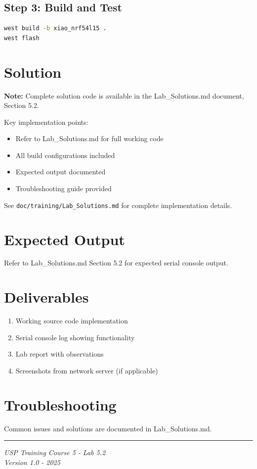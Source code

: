 \documentclass[11pt,a4paper]{article}
\begin{document}
\subsection{Step 3: Build and Test}
\begin{lstlisting}[language=bash]
west build -b xiao_nrf54l15 .
west flash
\end{lstlisting}

\section{Solution}

\begin{solutionbox}
\textbf{Note:} Complete solution code is available in the Lab\_Solutions.md document, Section 5.2.

Key implementation points:
\begin{itemize}
    \item Refer to Lab\_Solutions.md for full working code
    \item All build configurations included
    \item Expected output documented
    \item Troubleshooting guide provided
\end{itemize}

See \texttt{doc/training/Lab\_Solutions.md} for complete implementation details.
\end{solutionbox}

\section{Expected Output}

Refer to Lab\_Solutions.md Section 5.2 for expected serial console output.

\section{Deliverables}

\begin{enumerate}[itemsep=10pt]
    \item Working source code implementation
    \item Serial console log showing functionality
    \item Lab report with observations
    \item Screenshots from network server (if applicable)
\end{enumerate}

\section{Troubleshooting}

Common issues and solutions are documented in Lab\_Solutions.md.

\vfill
\noindent\rule{\textwidth}{0.4pt}
\begin{center}
\textit{USP Training Course 5 - Lab 5.2}\\
\textit{Version 1.0 - 2025}
\end{center}
\end{document}
